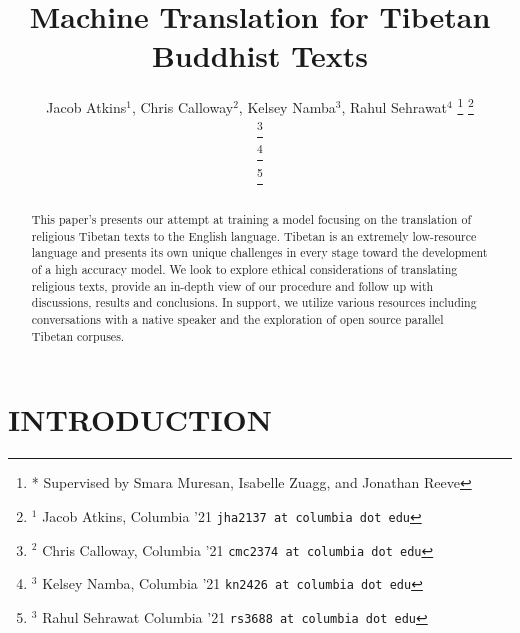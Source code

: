 \documentclass[letterpaper, 12 pt, conference]{ieeeconf}  %
\title{\LARGE \bf
Machine Translation for Tibetan Buddhist Texts
}
\author{ Jacob Atkins$^{1}$, Chris Calloway$^{2}$, Kelsey Namba$^{3}$, Rahul Sehrawat$^{4}$%
\thanks{* Supervised by Smara Muresan, Isabelle Zuagg, and Jonathan Reeve}%
\thanks{$^{1}$ Jacob Atkins, Columbia '21
        {\tt\small jha2137 at columbia dot edu}}%
        
\thanks{$^{2}$ Chris Calloway, Columbia '21
        {\tt\small cmc2374 at columbia dot edu}}%
        
\thanks{$^{3}$ Kelsey Namba, Columbia '21
        {\tt\small kn2426 at columbia dot edu}}%
        
        
\thanks{$^{3}$ Rahul Sehrawat Columbia '21
        {\tt\small rs3688 at columbia dot edu}}%





}
\begin{document}
\maketitle
\thispagestyle{empty}
\pagestyle{empty}


\begin{abstract}

This paper’s presents our attempt at training a model focusing on the translation of religious Tibetan texts to the English language. Tibetan is an extremely low-resource language and presents its own unique challenges in every stage toward the development of a high accuracy model. We look to explore ethical considerations of translating religious texts, provide an in-depth view of our procedure and follow up with discussions, results and conclusions. In support, we utilize various resources including conversations with a native speaker and the exploration of open source parallel Tibetan corpuses.



\end{abstract}


\section{INTRODUCTION}
\end{document}
